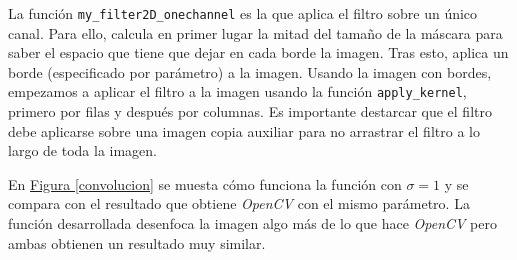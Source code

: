 \documentclass[11pt,a4paper]{article}
\theoremstyle{plain}
\theoremstyle{definition}
\begin{document}
La función \texttt{my\_filter2D\_onechannel} es la que aplica el filtro sobre un único canal. Para ello, calcula en primer lugar la mitad del tamaño de la máscara para saber el espacio que tiene que dejar en cada borde la imagen. Tras esto, aplica un borde (especificado por parámetro) a la imagen. Usando la imagen con bordes, empezamos a aplicar el filtro a la imagen usando la función \texttt{apply\_kernel}, primero por filas y después por columnas. Es importante destarcar que el filtro debe aplicarse sobre una imagen copia auxiliar para no arrastrar el filtro a lo largo de toda la imagen.

En \hyperref[convolucion]{Figura \ref*{convolucion}} se muesta cómo funciona la función con $\sigma = 1$ y se compara con el resultado que obtiene \textit{OpenCV} con el mismo parámetro. La función desarrollada desenfoca la imagen algo más de lo que hace \textit{OpenCV} pero ambas obtienen un resultado muy similar.
\end{document}
